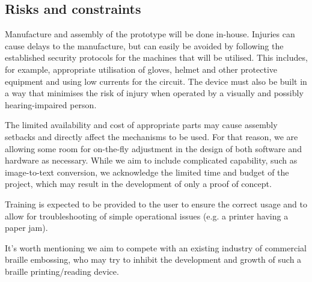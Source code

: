 \subsection{Risks and constraints}
Manufacture and assembly of the prototype will be done in-house.
Injuries can cause delays to the manufacture, but can easily be avoided by following the established security protocols for the machines that will be utilised.
This includes, for example, appropriate utilisation of gloves, helmet and other protective equipment and using low currents for the circuit.
The device must also be built in a way that minimises the risk of injury when operated by a visually and possibly hearing-impaired person.

The limited availability and cost of appropriate parts may cause assembly setbacks and directly affect the mechanisms to be used.
For that reason, we are allowing some room for on-the-fly adjustment in the design of both software and hardware as necessary.
While we aim to include complicated capability, such as image-to-text conversion, we acknowledge the limited time and budget of the project, which may result in the development of only a proof of concept.

Training is expected to be provided to the user to ensure the correct usage and to allow for troubleshooting of simple operational issues (e.g. a printer having a paper jam).

It's worth mentioning we aim to compete with an existing industry of commercial braille embossing, who may try to inhibit the development and growth of such a braille printing/reading device.